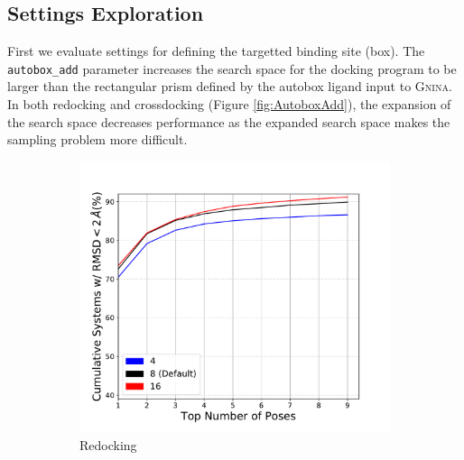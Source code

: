 \documentclass[journal=jcisd8,manuscript=article]{achemso}
\begin{document}
\subsection{Settings Exploration}

First we evaluate settings for defining the targetted binding site (box). The \texttt{autobox\_add} parameter increases the search space for the docking program to be larger than the rectangular prism defined by the autobox ligand input to \textsc{Gnina}. In both redocking and crossdocking (Figure \ref{fig:AutoboxAdd}), the expansion of the search space decreases performance as the expanded search space makes the sampling problem more difficult.

\begin{figure}    
        \begin{subfigure}[b]{0.48\textwidth}    
		\centering
		\includegraphics[width=\textwidth]{figures/redocking/sweep_exhaustiveness_line.pdf}
		\caption{Redocking}
		\label{fig:exhaustiveness rd}
        \end{subfigure}    
        \begin{subfigure}[b]{0.48\textwidth}    
		\centering

\end{subfigure}
\end{figure}
\end{document}
